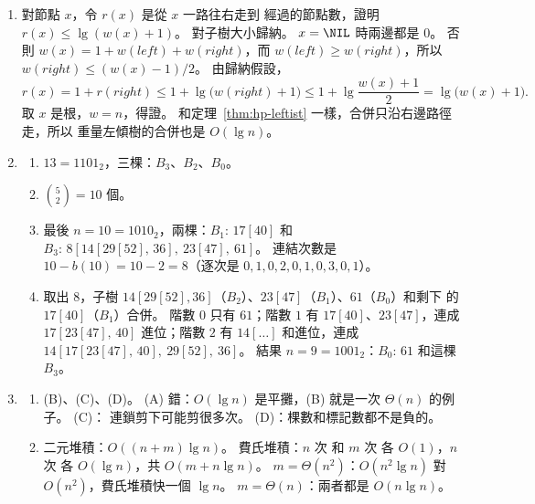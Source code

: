 \begin{enumerate}
取出 $23$：合併 $24(\ldots)$ 和 $26(\ldots)$。 右邊路徑 $24, 27$ 和 $26$ 合成
$24 \to 26 \to 27$。 $27$ 的 $s = 1$；$26$ 左邊 $32$（$s = 2$）不小於右邊 $27$（$s = 1$），
$s(26) = 2$；$24$ 左邊 $39$（$s = 2$）不小於右邊 $26$（$s = 2$），$s(24) = 3$。 結果
\[
24\bigl(39(57, 61),\ 26(32(62, 60),\ 27(38, -))\bigr).
\]

\item 對節點 $x$，令 $r(x)$ 是從 $x$ 一路往右走到 \NIL 經過的節點數，證明
$r(x) \le \lg(w(x) + 1)$。 對子樹大小歸納。 $x = \NIL$ 時兩邊都是 $0$。 否則
$w(x) = 1 + w(\mathit{left}) + w(\mathit{right})$，而 $w(\mathit{left}) \ge
w(\mathit{right})$，所以 $w(\mathit{right}) \le (w(x) - 1)/2$。 由歸納假設，
\[
r(x) = 1 + r(\mathit{right}) \le 1 + \lg\bigl(w(\mathit{right}) + 1\bigr)
\le 1 + \lg\frac{w(x) + 1}{2} = \lg\bigl(w(x) + 1\bigr).
\]
取 $x$ 是根，$w = n$，得證。 和定理~\ref{thm:hp-leftist} 一樣，合併只沿右邊路徑走，所以
重量左傾樹的合併也是 $O(\lg n)$。

\item
\begin{enumerate}
\item $13 = 1101_2$，三棵：$B_3$、$B_2$、$B_0$。
\item $\binom{5}{2} = 10$ 個。
\item 最後 $n = 10 = 1010_2$，兩棵：$B_1{:}\,17[40]$ 和
$B_3{:}\,8[14[29[52],\,36],\ 23[47],\ 61]$。 連結次數是 $10 - b(10) = 10 - 2 = 8$（逐次是
$0, 1, 0, 2, 0, 1, 0, 3, 0, 1$）。
\item 取出 $8$，子樹 $14[29[52], 36]$（$B_2$）、$23[47]$（$B_1$）、$61$（$B_0$）和剩下
的 $17[40]$（$B_1$）合併。 階數 $0$ 只有 $61$；階數 $1$ 有 $17[40]$、$23[47]$，連成
$17[23[47],\,40]$ 進位；階數 $2$ 有 $14[\ldots]$ 和進位，連成
$14[17[23[47],\,40],\ 29[52],\ 36]$。 結果 $n = 9 = 1001_2$：$B_0{:}\,61$ 和這棵 $B_3$。
\end{enumerate}

\item
\begin{enumerate}
\item (B)、(C)、(D)。 (A) 錯：$O(\lg n)$ 是平攤，(B) 就是一次 $\Theta(n)$ 的例子。 (C)：
連鎖剪下可能剪很多次。 (D)：棵數和標記數都不是負的。
\item 二元堆積：$O((n + m) \lg n)$。 費氏堆積：$n$ 次  和 $m$ 次
 各 $O(1)$，$n$ 次  各 $O(\lg n)$，共
$O(m + n \lg n)$。 $m = \Theta(n^2)$：$O(n^2 \lg n)$ 對 $O(n^2)$，費氏堆積快一個
$\lg n$。 $m = \Theta(n)$：兩者都是 $O(n \lg n)$。
\end{enumerate}
\end{enumerate}

